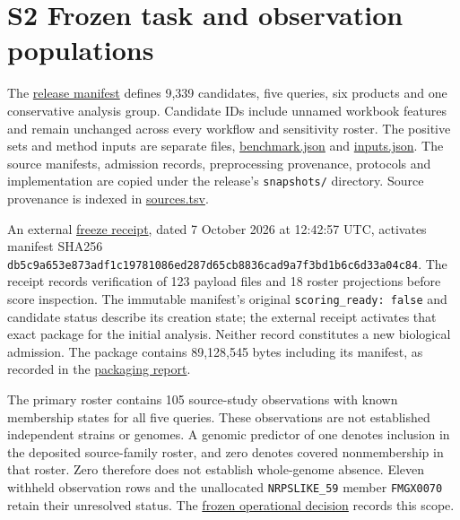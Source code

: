 \documentclass[
  10pt,
  a4paper,
]{article}
\begin{document}
\section{S2 Frozen task and observation populations}\label{s2-frozen-task-and-observation-populations}

The \href{https://github.com/vinvomero/fungallink-benchmark/blob/main/data/processed/source-selected-gcf-analysis-v1/manifest.json}{release manifest} defines 9,339 candidates, five queries, six products and one conservative analysis group. Candidate IDs include unnamed workbook features and remain unchanged across every workflow and sensitivity roster. The positive sets and method inputs are separate files, \href{https://github.com/vinvomero/fungallink-benchmark/blob/main/data/processed/source-selected-gcf-analysis-v1/benchmark.json}{benchmark.json} and \href{https://github.com/vinvomero/fungallink-benchmark/blob/main/data/processed/source-selected-gcf-analysis-v1/inputs.json}{inputs.json}. The source manifests, admission records, preprocessing provenance, protocols and implementation are copied under the release's \texttt{snapshots/} directory. Source provenance is indexed in \href{https://github.com/vinvomero/fungallink-benchmark/blob/main/data/processed/source-selected-gcf-analysis-v1/snapshots/data/manifests/sources.tsv}{sources.tsv}.

An external \href{https://github.com/vinvomero/fungallink-benchmark/blob/main/data/processed/source-selected-gcf-analysis-v1-results/freeze.json}{freeze receipt}, dated 7 October 2026 at 12:42:57 UTC, activates manifest SHA256 \nolinkurl{db5c9a653e873adf1c19781086ed287d65cb8836cad9a7f3bd1b6c6d33a04c84}. The receipt records verification of 123 payload files and 18 roster projections before score inspection. The immutable manifest's original \texttt{scoring\_ready:\ false} and candidate status describe its creation state; the external receipt activates that exact package for the initial analysis. Neither record constitutes a new biological admission. The package contains 89,128,545 bytes including its manifest, as recorded in the \href{https://github.com/vinvomero/fungallink-benchmark/blob/main/docs/data/source-selected-gcf-analysis-v1.md}{packaging report}.

The primary roster contains 105 source-study observations with known membership states for all five queries. These observations are not established independent strains or genomes. A genomic predictor of one denotes inclusion in the deposited source-family roster, and zero denotes covered nonmembership in that roster. Zero therefore does not establish whole-genome absence. Eleven withheld observation rows and the unallocated \texttt{NRPSLIKE\_59} member \texttt{FMGX0070} retain their unresolved status. The \href{https://github.com/vinvomero/fungallink-benchmark/blob/main/data/processed/source-selected-gcf-analysis-v1/snapshots/protocol/source-selected-gcf-analysis-decision-2026-10-07.md}{frozen operational decision} records this scope.
\end{document}
